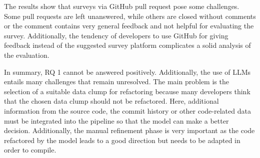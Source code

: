 The results show that surveys via GitHub pull request pose some challenges. Some pull requests are left unanswered, while others are closed without comments or the comment contains very general feedback and not helpful for evaluating the survey. Additionally, the tendency of developers to use GitHub for giving feedback  instead of the suggested survey platform complicates a solid analysis of the evaluation.

In summary, RQ 1 cannot be answered positively. Additionally, the use of \acp{LLM} entails many challenges that remain unresolved. The main problem is the selection of a suitable data clump for refactoring because many developers think that the chosen data clump should not be refactored. Here, additional information from the source code, the commit history or other code-related data must be integrated into the pipeline so that the model can make a better decision. Additionally, the manual refinement phase is very important as the code refactored by the model leads to a good direction but needs to be adapted in order to compile. 
